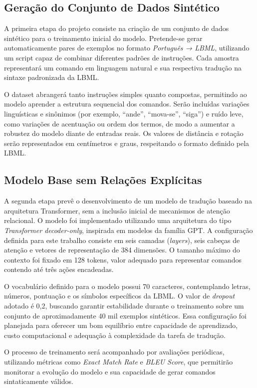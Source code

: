 \documentclass[12pt]{article}
\begin{document}
\subsection{Geração do Conjunto de Dados Sintético}

A primeira etapa do projeto consiste na criação de um conjunto de dados sintético para o treinamento inicial do modelo. Pretende-se gerar automaticamente pares de exemplos no formato \textit{Português → LBML}, utilizando um script capaz de combinar diferentes padrões de instruções. Cada amostra representará um comando em linguagem natural e sua respectiva tradução na sintaxe padronizada da LBML.

O dataset abrangerá tanto instruções simples quanto compostas, permitindo ao modelo aprender a estrutura sequencial dos comandos. Serão incluídas variações linguísticas e sinônimos (por exemplo, “ande”, “mova-se”, “siga”) e ruído leve, como variações de acentuação ou ordem dos termos, de modo a aumentar a robustez do modelo diante de entradas reais. Os valores de distância e rotação serão representados em centímetros e graus, respeitando o formato definido pela LBML.

\subsection{Modelo Base sem Relações Explícitas}

A segunda etapa prevê o desenvolvimento de um modelo de tradução baseado na arquitetura Transformer, sem a inclusão inicial de mecanismos de atenção relacional. O modelo foi implementado utilizando uma arquitetura do tipo \textit{Transformer decoder-only}, inspirada em modelos da família GPT. A configuração definida para este trabalho consiste em seis camadas (\textit{layers}), seis cabeças de atenção e vetores de representação de 384 dimensões. O tamanho máximo do contexto foi fixado em 128 tokens, valor adequado para representar comandos contendo até três ações encadeadas.

O vocabulário definido para o modelo possui 70 caracteres, contemplando letras, números, pontuação e os símbolos específicos da LBML. O valor de \textit{dropout} adotado é 0{,}2, buscando garantir estabilidade durante o treinamento sobre um conjunto de aproximadamente 40 mil exemplos sintéticos. Essa configuração foi planejada para oferecer um bom equilíbrio entre capacidade de aprendizado, custo computacional e adequação à complexidade da tarefa de tradução.

O processo de treinamento será acompanhado por avaliações periódicas, utilizando métricas como \textit{Exact Match Rate} e \textit{BLEU Score}, que permitirão monitorar a evolução do modelo e sua capacidade de gerar comandos sintaticamente válidos.
\end{document}
